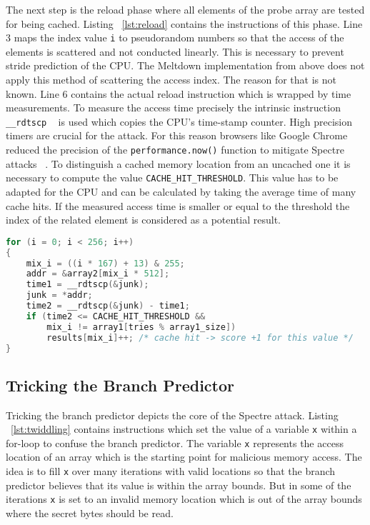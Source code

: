 \documentclass[a4paper,oneside,openright] {scrreprt}
\begin{document}
The next step is the reload phase where all elements of the probe array are tested for being cached. 
Listing ~\ref{lst:reload} contains the instructions of this phase. 
Line 3 maps the index value \texttt{i} to pseudorandom numbers
 so that the access of the elements is scattered and not conducted linearly. 
This is necessary to prevent stride prediction of the CPU. 
The Meltdown implementation from above does not apply this method of scattering the access index.
The reason for that is not known.
Line 6 contains the actual reload instruction which is wrapped by time measurements.
To measure the access time precisely the intrinsic instruction \texttt{\_\_rdtscp} ~\cite{intelintrinsics} is used which
copies the CPU's time-stamp counter. High precision timers are crucial for the attack. For this reason browsers like 
Google Chrome reduced the precision of the \texttt{performance.now()} function to mitigate Spectre attacks ~\cite{chromeSpectreMeltdown}.
To distinguish a cached memory location from an uncached one it is necessary to compute the value \texttt{CACHE\_HIT\_THRESHOLD}.
This value has to be adapted for the CPU and can be calculated by taking the average time of many cache hits.
If the measured access time is smaller or equal to the threshold the index of the related element is considered as a potential result.

\begin{lstlisting}[language=C, caption=Spectre: Reload, label={lst:reload}]
for (i = 0; i < 256; i++)
{
    mix_i = ((i * 167) + 13) & 255;
    addr = &array2[mix_i * 512];
    time1 = __rdtscp(&junk);
    junk = *addr;
    time2 = __rdtscp(&junk) - time1;
    if (time2 <= CACHE_HIT_THRESHOLD &&
        mix_i != array1[tries % array1_size])
        results[mix_i]++; /* cache hit -> score +1 for this value */
}
\end{lstlisting}

\subsection{Tricking the Branch Predictor}
\label{ch:intro:motivation:A}

Tricking the branch predictor depicts the core of the Spectre attack. 
Listing ~\ref{lst:twiddling} contains instructions which
 set the value of a variable \texttt{x} within a for-loop to confuse the branch predictor.
The variable \texttt{x} represents the access location of an array which is the starting point for malicious memory access.
The idea is to fill \texttt{x} over many iterations with valid locations so that the branch predictor believes
that its value is within the array bounds. But in some of the iterations \texttt{x} is set to an invalid memory location
which is out of the array bounds where the secret bytes should be read.
\end{document}
